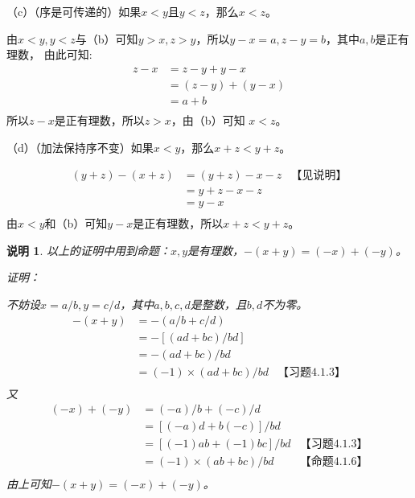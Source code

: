 \documentclass{article}
\theoremstyle{mystyle}
\newtheorem*{zremark}{说明}
\begin{document}
（c）（序是可传递的）如果$x < y$且$y < z$，那么$x < z$。

由$x < y, y < z$与（b）可知$y>x,z>y$，所以$y - x = a, z - y = b$，其中$a, b$是正有理数，
由此可知:
\begin{align*}
  z - x & = z - y + y - x     \\
        & = (z - y) + (y - x) \\
        & = a + b             \\
\end{align*}
所以$z - x $是正有理数，所以$z > x$，由（b）可知 $x < z$。

（d）（加法保持序不变）如果$x < y$，那么$x + z < y + z$。

\begin{align*}
  (y + z) - (x + z) & = (y + z) - x - z & \text{【见说明】} \\
                    & = y + z - x - z                  \\
                    & = y - x                          \\
\end{align*}
由$x < y$和（b）可知$y-x$是正有理数，所以$x + z < y + z$。

\begin{zgraytheorem}
  \begin{zremark}
    以上的证明中用到命题：$x,y$是有理数，$-(x+y) = (-x) + (-y)$。

    证明：

    不妨设$x = a/b, y = c/d$，其中$a,b,c,d$是整数，且$b,d$不为零。
    \begin{align*}
      -(x+y) & = -(a/b + c/d)                              \\
             & = -[(ad+bc)/bd]                             \\
             & = -(ad+bc)/bd                               \\
             & = (-1) \times (ad+bc)/bd & \text{【习题4.1.3】} \\
    \end{align*}
    又
    \begin{align*}
      (-x) + (-y) & = (-a)/b + (-c)/d                              \\
                  & = [(-a)d + b(-c)] / bd                         \\
                  & = [(-1)ab + (-1)bc] /bd     & \text{【习题4.1.3】} \\
                  & = (-1) \times (ab + bc) /bd & \text{【命题4.1.6】} \\
    \end{align*}
    由上可知$-(x+y) = (-x) + (-y)$。

  \end{zremark}
\end{zgraytheorem}
\end{document}

